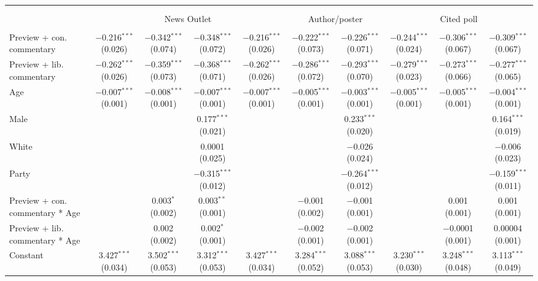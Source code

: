 
\begin{table}[!htbp] \centering 
  \caption{} 
  \label{} 
\begin{tabular}{@{\extracolsep{5pt}}lccccccccc} 
\\[-1.8ex]\hline 
\hline \\[-1.8ex] 
\\[-1.8ex] & \multicolumn{4}{c}{News Outlet} & \multicolumn{2}{c}{Author/poster} & \multicolumn{3}{c}{Cited poll} \\ 
\hline \\[-1.8ex] 
 Preview + con. commentary & $-$0.216$^{***}$ (0.026) & $-$0.342$^{***}$ (0.074) & $-$0.348$^{***}$ (0.072) & $-$0.216$^{***}$ (0.026) & $-$0.222$^{***}$ (0.073) & $-$0.226$^{***}$ (0.071) & $-$0.244$^{***}$ (0.024) & $-$0.306$^{***}$ (0.067) & $-$0.309$^{***}$ (0.067) \\ 
  Preview + lib. commentary & $-$0.262$^{***}$ (0.026) & $-$0.359$^{***}$ (0.073) & $-$0.368$^{***}$ (0.071) & $-$0.262$^{***}$ (0.026) & $-$0.286$^{***}$ (0.072) & $-$0.293$^{***}$ (0.070) & $-$0.279$^{***}$ (0.023) & $-$0.273$^{***}$ (0.066) & $-$0.277$^{***}$ (0.065) \\ 
  Age & $-$0.007$^{***}$ (0.001) & $-$0.008$^{***}$ (0.001) & $-$0.007$^{***}$ (0.001) & $-$0.007$^{***}$ (0.001) & $-$0.005$^{***}$ (0.001) & $-$0.003$^{***}$ (0.001) & $-$0.005$^{***}$ (0.001) & $-$0.005$^{***}$ (0.001) & $-$0.004$^{***}$ (0.001) \\ 
  Male &  &  & 0.177$^{***}$ (0.021) &  &  & 0.233$^{***}$ (0.020) &  &  & 0.164$^{***}$ (0.019) \\ 
  White &  &  & 0.0001 (0.025) &  &  & $-$0.026 (0.024) &  &  & $-$0.006 (0.023) \\ 
  Party &  &  & $-$0.315$^{***}$ (0.012) &  &  & $-$0.264$^{***}$ (0.012) &  &  & $-$0.159$^{***}$ (0.011) \\ 
  Preview + con. commentary * Age &  & 0.003$^{*}$ (0.002) & 0.003$^{**}$ (0.001) &  & $-$0.001 (0.002) & $-$0.001 (0.001) &  & 0.001 (0.001) & 0.001 (0.001) \\ 
  Preview + lib. commentary * Age &  & 0.002 (0.002) & 0.002$^{*}$ (0.001) &  & $-$0.002 (0.001) & $-$0.002 (0.001) &  & $-$0.0001 (0.001) & 0.00004 (0.001) \\ 
  Constant & 3.427$^{***}$ (0.034) & 3.502$^{***}$ (0.053) & 3.312$^{***}$ (0.053) & 3.427$^{***}$ (0.034) & 3.284$^{***}$ (0.052) & 3.088$^{***}$ (0.053) & 3.230$^{***}$ (0.030) & 3.248$^{***}$ (0.048) & 3.113$^{***}$ (0.049) \\ 

\end{tabular}
\end{table}
